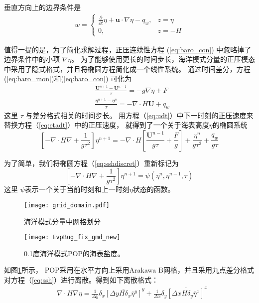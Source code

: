 垂直方向上的边界条件是
\begin{align}
\label{eq:bound_w}
w = \left\{ \begin{array}{ll}
\frac{\partial}{\partial t} \eta  +\textbf{u}\cdot\nabla \eta - q_w, & z = \eta  \\
0, & z = -H
\end{array} \right.
\end{align}
 
值得一提的是，为了简化求解过程，正压连续性方程 (\ref{eq:baro_con}) 中忽略掉了边界条件中的小项 $\nabla \eta$\citep{smith2010parallel}。
为了能够使用更长的时间步长，海洋模式分量的正压模态中采用了隐式格式，并且将椭圆方程简化成一个线性系统。 通过时间差分，方程  (\ref{eq:baro_mon})和(\ref{eq:baro_con}) 可化为
\begin{align}
&\displaystyle \frac{ \textbf{U}^{n+1} - \textbf{U}^{n-1}}{\tau}  = -g \nabla \eta + F \label{eq:udt} \\
&\displaystyle \frac{\eta^{n+1} - \eta^n }{\tau}  = - \nabla \cdot H\textbf{U} + q_w \label{eq:etadt}
\end{align}
这里 $\tau$ 与差分格式相关的时间步长。 
用方程（\ref{eq:udt}）中下一时刻的正压速度来替换方程（\ref{eq:etadt}）中的正压速度， 就得到了一个关于海表高度$\eta$的椭圆系统
\begin{equation}
\label{eq:sshdiscret}
     [-\nabla\cdot H \nabla + \frac{1}{g  \tau^2}]\eta^{n+1}
           = -\nabla\cdot H[\frac{\textbf{U}^{n-1}}{g \tau} + \frac{F}{g}] + \frac{\eta^n}{g\tau^2} +\frac{q_w}{g\tau}
\end{equation}
 
为了简单，我们将椭圆方程（\ref{eq:sshdiscret}）重新标记为
\begin{equation}
\label{eq:ssh}
[-\nabla \cdot H\nabla +\frac{1}{g  \tau^2}]\eta^{n+1} = \psi(\eta^n,\eta^{n-1},\tau)
\end{equation}
这里 $\psi$表示一个关于当前时刻和上一时刻$\eta$状态的函数。
 

\begin{figure}[!htbp]
\texttt{[image: grid\_domain.pdf]}
\caption[] {海洋模式分量中网格划分\label{fig:grid1}}
\end{figure}

\begin{figure}[!htbp]
\texttt{[image: EvpBug\_fix\_gmd\_new]}
\caption[] {0.1度海洋模式POP的海表盐度。 \label{fig:sst}}
\end{figure}

如图\ref{fig:grid1}所示， POP采用在水平方向上采用Arakawa B网格\citep{smith2010parallel}，并且采用九点差分格式对方程（\ref{eq:ssh}）进行离散。得到如下离散格式：
\begin{align}
    & \nabla\cdot H \nabla \eta  =\frac{1}{\Delta y}\delta_x \overline{[\Delta y H  \delta_x\overline{\eta}^y]}^y +\frac{1}{\Delta x}\delta_y \overline{[\Delta x H  \delta_y\overline{\eta}^x]}^x \label{eq:nabla2}
  \end{align}

